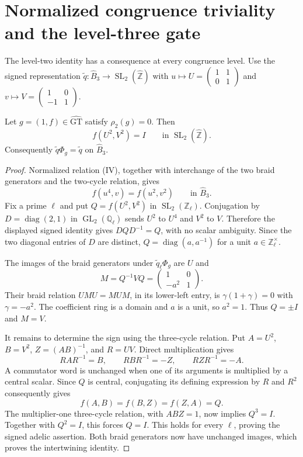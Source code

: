 \section{Normalized congruence triviality and the level-three gate}
\label{sec:normalized-congruence}

The level-two identity has a consequence at every congruence level.
Use the signed representation
$\widetilde q:\widehat B_3\to\operatorname{SL}_2(\widehat{\mathbb Z})$
with $u\mapsto U=\left(\begin{smallmatrix}1&1\\0&1\end{smallmatrix}\right)$
and $v\mapsto V=\left(\begin{smallmatrix}1&0\\-1&1\end{smallmatrix}\right)$.

\begin{proposition}\label{prop:normalized-congruence-triviality}
Let $g=(1,f)\in\widehat{\mathrm{GT}}$ satisfy $\rho_2(g)=0$.
Then
\[
 f(U^2,V^2)=I
       \qquad\text{in }\operatorname{SL}_2(\widehat{\mathbb Z}).
\]
Consequently $\widetilde q\Phi_g=\widetilde q$ on $\widehat B_3$.
\end{proposition}
\begin{proof}
Normalized relation (IV), together with interchange of the two braid
generators and the two-cycle relation, gives
\[
 f(u^4,v)=f(u^2,v^2)
       \qquad\text{in }\widehat B_3.
\]
Fix a prime $\ell$ and put $Q=f(U^2,V^2)$ in
$\operatorname{SL}_2(\mathbb Z_\ell)$.
Conjugation by $D=\operatorname{diag}(2,1)$ in
$\operatorname{GL}_2(\mathbb Q_\ell)$ sends $U^2$ to $U^4$ and
$V^2$ to $V$. Therefore the displayed signed identity gives
$DQD^{-1}=Q$, with no scalar ambiguity. Since the two diagonal
entries of $D$ are distinct, $Q=\operatorname{diag}(a,a^{-1})$
for a unit $a\in\mathbb Z_\ell^\times$.

The images of the braid generators under
$\widetilde q_\ell\Phi_g$ are $U$ and
\[
 M=Q^{-1}VQ=\begin{pmatrix}1&0\\-a^2&1\end{pmatrix}.
\]
Their braid relation $UMU=MUM$, in its lower-left entry, is
$\gamma(1+\gamma)=0$ with $\gamma=-a^2$.
The coefficient ring is a domain and $a$ is a unit, so $a^2=1$.
Thus $Q=\pm I$ and $M=V$.

It remains to determine the sign using the three-cycle relation.
Put $A=U^2$, $B=V^2$, $Z=(AB)^{-1}$, and $R=UV$.
Direct multiplication gives
\[
 RAR^{-1}=B,\qquad RBR^{-1}=-Z,\qquad RZR^{-1}=-A.
\]
A commutator word is unchanged when one of its arguments is multiplied
by a central scalar. Since $Q$ is central, conjugating its defining
expression by $R$ and $R^2$ consequently gives
\[
 f(A,B)=f(B,Z)=f(Z,A)=Q.
\]
The multiplier-one three-cycle relation, with $ABZ=1$, now implies
$Q^3=I$. Together with $Q^2=I$, this forces $Q=I$.
This holds for every $\ell$, proving the signed adelic assertion.
Both braid generators now have unchanged images, which proves the
intertwining identity.
\end{proof}

